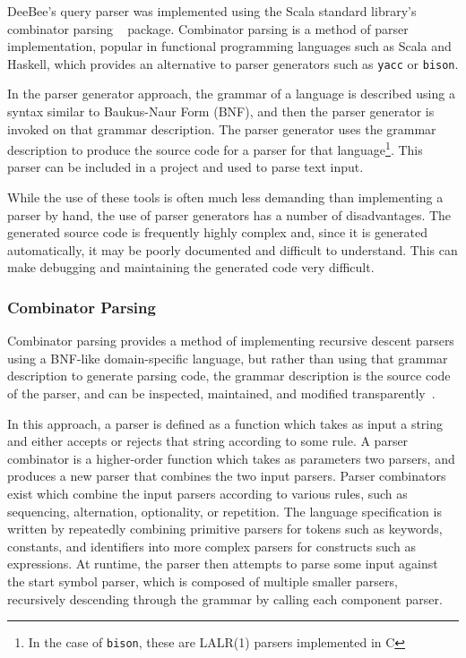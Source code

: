 DeeBee's query parser was implemented using the Scala standard library's combinator parsing ~\cite{moors2008parser} package. Combinator parsing is a method of parser implementation, popular in functional programming languages such as Scala and Haskell, which provides an alternative to parser generators such as \texttt{yacc} or \texttt{bison}.

In the parser generator approach, the grammar of a language is described using a syntax similar to Baukus-Naur Form (BNF), and then the parser generator is invoked on that grammar description. The parser generator uses the grammar description to produce the source code for a parser for that language\footnote{In the case of \texttt{bison}, these are LALR(1) parsers implemented in C}. This parser can be included in a project and used to parse text input. 

While the use of these tools is often much less demanding than implementing a parser by hand, the use of parser generators has a number of disadvantages. The generated source code is frequently highly complex and, since it is generated automatically, it may be poorly documented and difficult to understand. This can make debugging and maintaining the generated code very difficult.

\subsubsection{Combinator Parsing}
Combinator parsing provides a method of implementing recursive descent parsers using a BNF-like domain-specific language,  but rather than using that grammar description to generate parsing code, the grammar description is the source code of the parser, and can be inspected, maintained, and modified transparently~\cite{ghosh2010dsls,hofer2008polymorphic,moors2008parser}.

In this approach, a parser is defined as a function which takes as input a string and either accepts or rejects that string according to some rule. A parser combinator is a higher-order function which takes as parameters two parsers, and produces a new parser that combines the two input parsers. Parser combinators exist which combine the input parsers according to various rules, such as sequencing, alternation, optionality, or repetition. The language specification is written by repeatedly combining primitive parsers for tokens such as keywords, constants, and identifiers into more complex parsers for constructs such as expressions. At runtime, the parser then attempts to parse some input against the start symbol parser, which is composed of multiple smaller parsers, recursively descending through the grammar by calling each component parser.~\cite{moors2008parser,swierstra2001combinator,fokker1995functional,frost2008parser}

